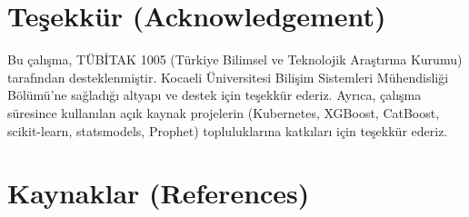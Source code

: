 
\section*{Teşekkür (Acknowledgement)}

Bu çalışma, TÜBİTAK 1005 (Türkiye Bilimsel ve Teknolojik Araştırma Kurumu) tarafından desteklenmiştir. Kocaeli Üniversitesi Bilişim Sistemleri Mühendisliği Bölümü'ne sağladığı altyapı ve destek için teşekkür ederiz. Ayrıca, çalışma süresince kullanılan açık kaynak projelerin (Kubernetes, XGBoost, CatBoost, scikit-learn, statsmodels, Prophet) topluluklarına katkıları için teşekkür ederiz.

\section*{Kaynaklar (References)}

